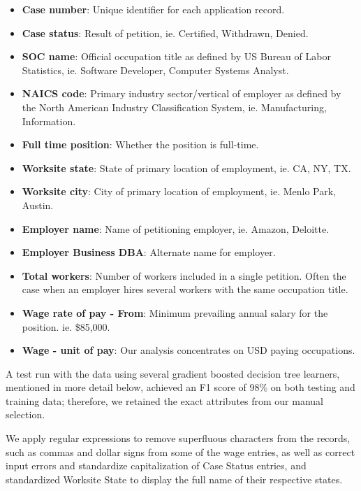 \documentclass[sigconf]{acmart}
\begin{document}
  \begin{itemize}
    
  \item \textbf{Case number}: Unique identifier for each application record.
  \item \textbf{Case status}: Result of petition, 
  ie. Certified, Withdrawn, Denied. 
  \item \textbf{SOC name}: Official occupation title as defined by US Bureau of Labor Statistics, 
  ie. Software Developer, Computer Systems Analyst.
  \item \textbf{NAICS code}: Primary industry sector/vertical of employer as defined by 
  the North American Industry Classification System, 
  ie. Manufacturing, Information.
  \item \textbf{Full time position}: Whether the position is full-time.
  \item \textbf{Worksite state}: State of primary location of employment,
  ie. CA, NY, TX.
  \item \textbf{Worksite city}: City of primary location of employment, 
  ie. Menlo Park, Austin.
  \item \textbf{Employer name}: Name of petitioning employer,
  ie. Amazon, Deloitte.
  \item \textbf{Employer Business DBA}: Alternate name for employer. 
  \item \textbf{Total workers}: Number of workers included in a single petition. 
  Often the case when an employer hires several workers with the same occupation title. 
  \item \textbf{Wage rate of pay - From}: Minimum prevailing annual salary for the position.
  ie. \$85,000.
  \item \textbf{Wage - unit of pay}: Our analysis concentrates on USD paying occupations.

  \end{itemize}

A test run with the data using several gradient boosted decision tree learners, 
mentioned in more detail below, achieved an F1 score of 98\% on both testing 
and training data; therefore, we retained the exact attributes from our manual selection. 


We apply regular expressions to remove superfluous characters from the records, 
such as commas and dollar signs from some of the wage entries, 
as well as correct input errors and standardize capitalization of Case Status entries, 
and standardized Worksite State to display the full name of their respective states.  
\end{document}
